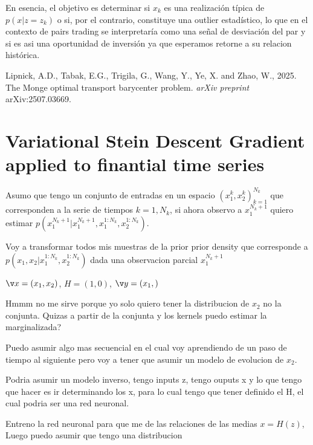 \documentclass{myarticle}
\begin{document}
En esencia, el objetivo es determinar si \( x_k \) es una realización típica de \( p(x | z = z_k) \) o si, por el contrario, constituye una outlier estadístico, lo que en el contexto de pairs trading se interpretaría como una señal de desviación del par y si es asi una oportunidad de inversi\'on ya que esperamos retorne a su relacion hist\'orica.

\vskip 1cm


\noindent Lipnick, A.D., Tabak, E.G., Trigila, G., Wang, Y., Ye, X. and Zhao, W., 2025. The Monge optimal transport barycenter problem. {\em arXiv preprint} arXiv:2507.03669.

\section{Variational Stein Descent Gradient applied to finantial time series}

Asumo que tengo un conjunto de entradas en un espacio $(x^k_1,x^k_2)_{k=1}^{N_k}$ que corresponden a la serie de tiempos $k=1,N_k$, si ahora observo a $x^{N_k+1}_1$ quiero estimar $p(x^{N_k+1}_1|x^{N_k+1}_1, x^{1:N_k}_1,x^{1:N_k}_2)$.

Voy a transformar todos mis muestras de la prior prior density que corresponde a $p(x_1,x_2|x^{1:N_k}_1,x^{1:N_k}_2)$ dada una observacion parcial $x^{N_k+1}_1$

$\v x = (x_1,x_2)$, $H=(1,0)$, $\v y =(x_1,)$

Hmmm no me sirve porque yo solo quiero tener la distribucion de $x_2$ no la conjunta. Quizas a partir de la conjunta y los kernels puedo estimar la marginalizada? 


Puedo asumir algo mas secuencial en el cual voy aprendiendo de un paso de tiempo al siguiente pero voy a tener que asumir un modelo de evolucion de $x_2$.

Podria asumir un modelo inverso, tengo inputs z, tengo ouputs x y lo que tengo que hacer es ir determinando los x, para lo cual tengo que tener definido el H, el cual podria ser una red neuronal.

Entreno la red neuronal para que me de las relaciones de las medias $x=H(z)$, Luego puedo asumir que tengo una distribucion 
\end{document}
